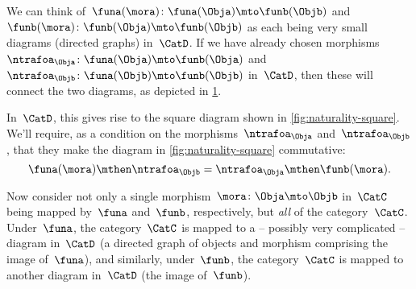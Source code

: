 We can think of~$\funa(\mora)\colon \funa(\Obja) \mto \funb(\Objb)$ and~$\funb(\mora)\colon \funb(\Obja) \mto \funb(\Objb)$ as each being very small diagrams (directed graphs) in~$\CatD$.
If we have already chosen morphisms~$\ntrafoa_\Obja\colon \funa(\Obja) \mto \funb(\Obja)$ and~$\ntrafoa_\Objb\colon \funa(\Objb) \mto \funb(\Objb)$ in~$\CatD$, then these will connect the two diagrams, as depicted in \cref{fig:two-functors-connected-diagram}.

%
\begin{figure}[h!]
    \begin{center}
    \end{center}
    \caption{
        \label{fig:two-functors-connected-diagram}}
\end{figure}
%

\begin{center}

\end{center}

In~$\CatD$, this gives rise to the square diagram shown in \cref{fig:naturality-square}.
We'll require, as a condition on the morphisms~$\ntrafoa_\Obja$ and~$\ntrafoa_\Objb$, that they make the diagram in \cref{fig:naturality-square} commutative:
\begin{equation}
    \funa(\mora) \mthen \ntrafoa_\Objb = \ntrafoa_\Obja \mthen \funb(\mora).
\end{equation}

%
\begin{marginfigure}
    \centering
    \caption{}
    \label{fig:naturality-square}
\end{marginfigure}
%

Now consider not only a single morphism~$\mora \colon \Obja \mto \Objb$ in~$\CatC$ being mapped by~$\funa$ and~$\funb$, respectively, but \emph{all} of the category~$\CatC$.
Under~$\funa$, the category~$\CatC$ is mapped to a -- possibly very complicated --  diagram in~$\CatD$ (a directed graph of objects and morphism comprising the image of~$\funa$), and similarly, under~$\funb$, the category~$\CatC$ is mapped to another diagram in~$\CatD$ (the image of~$\funb$).

